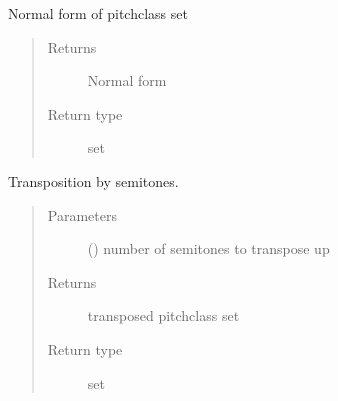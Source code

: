 \documentclass[letterpaper,10pt,english]{sphinxmanual}
\begin{document}
\begin{fulllineitems}
\begin{fulllineitems}
\sphinxAtStartPar
Normal form of pitch\sphinxhyphen{}class set
\begin{quote}\begin{description}
\item[{Returns}] \leavevmode
\sphinxAtStartPar
Normal form

\item[{Return type}] \leavevmode
\sphinxAtStartPar
set

\end{description}\end{quote}

\end{fulllineitems}



\begin{fulllineitems}
\sphinxAtStartPar
Transposition by  semitones.
\begin{quote}\begin{description}
\item[{Parameters}] \leavevmode
\sphinxAtStartPar
{} () \textendash{} number of semitones to transpose up

\item[{Returns}] \leavevmode
\sphinxAtStartPar
transposed pitch\sphinxhyphen{}class set

\item[{Return type}] \leavevmode
\sphinxAtStartPar
set

\end{description}\end{quote}

\end{fulllineitems}


\end{fulllineitems}
\end{document}

